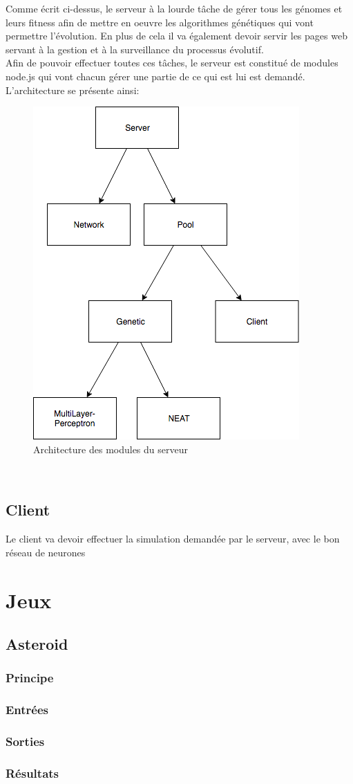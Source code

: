 \documentclass{article}
\begin{document}
Comme écrit ci-dessus, le serveur à la lourde tâche de gérer tous les génomes et leurs fitness afin de mettre en oeuvre les algorithmes génétiques qui vont permettre l'évolution. En plus de cela il va également devoir servir les pages web servant à la gestion et à la surveillance du processus évolutif.\\
Afin de pouvoir effectuer toutes ces tâches, le serveur est constitué de modules node.js qui vont chacun gérer une partie de ce qui est lui est demandé.\\
L'architecture se présente ainsi:
\begin{figure}[h]
\begin{center}
	\includegraphics[scale=0.5]{"server.png"} 
	\caption{Architecture des modules du serveur}
\end{center}
\end{figure}\\

\subsection{Client}

Le client va devoir effectuer la simulation demandée par le serveur, avec le bon réseau de neurones


\section{Jeux}
\subsection{Asteroid}
\subsubsection{Principe}
\subsubsection{Entrées}
\subsubsection{Sorties}
\subsubsection{Résultats}
\end{document}
